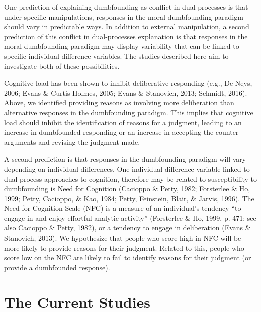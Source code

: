 \documentclass[
  american,
  man,floatsintext]{apa7}
\begin{document}
One prediction of explaining dumbfounding as conflict in dual-processes is that under specific manipulations, responses in the moral dumbfounding paradigm should vary in predictable ways. In addition to external manipulation, a second prediction of this conflict in dual-processes explanation is that responses in the moral dumbfounding paradigm may display variability that can be linked to specific individual difference variables. The studies described here aim to investigate both of these possibilities.

Cognitive load has been shown to inhibit deliberative responding (e.g., De Neys, 2006; Evans \& Curtis-Holmes, 2005; Evans \& Stanovich, 2013; Schmidt, 2016). Above, we identified providing reasons as involving more deliberation than alternative responses in the dumbfounding paradigm. This implies that cognitive load should inhibit the identification of reasons for a judgment, leading to an increase in dumbfounded responding or an increase in accepting the counter-arguments and revising the judgment made.

A second prediction is that responses in the dumbfounding paradigm will vary depending on individual differences. One individual difference variable linked to dual-process approaches to cognition, therefore may be related to susceptibility to dumbfounding is Need for Cognition (Cacioppo \& Petty, 1982; Forsterlee \& Ho, 1999; Petty, Cacioppo, \& Kao, 1984; Petty, Feinstein, Blair, \& Jarvis, 1996). The Need for Cognition Scale (NFC) is a measure of an individual's tendency ``to engage in and enjoy effortful analytic activity'' (Forsterlee \& Ho, 1999, p. 471; see also Cacioppo \& Petty, 1982), or a tendency to engage in deliberation (Evans \& Stanovich, 2013). We hypothesize that people who score high in NFC will be more likely to provide reasons for their judgment. Related to this, people who score low on the NFC are likely to fail to identify reasons for their judgment (or provide a dumbfounded response).

\hypertarget{the-current-studies}{%
\section{The Current Studies}\label{the-current-studies}}
\end{document}
